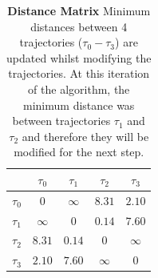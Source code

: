 \begin{table}[t]
	\centering
	\caption{\textbf{Distance Matrix} Minimum distances between 4 trajectories ($\tau_0 - \tau_3$) are updated whilst modifying the trajectories.
	At this iteration of the algorithm, the minimum distance was between trajectories $\tau_1$ and $\tau_2$ and therefore they will be modified for the next step.}
	\begin{tabular}{|c||cccc|}
		\hline
		 			& $\tau_0$		& $\tau_1$ 		& $\tau_2$	& $\tau_3$	\\
		 \hline \hline
		$\tau_0$	& $0$			&	$\infty$ 	& $8.31$	& $2.10$	\\
		$\tau_1$	& $\infty$		&	$0$			& \cellcolor[gray]{0.9} $\mathbf{0.14}$	& $7.60$	\\
		$\tau_2$	& $8.31$		&	\cellcolor[gray]{0.9}$\mathbf{0.14}$ 		& $0$		& $\infty$	\\
		$\tau_3$	& $2.10$		&	$7.60$ 		& $\infty$	& $0$		\\
		\hline
		\end{tabular}
\label{tab:minimum-distances}
\end{table}






% 
% 

